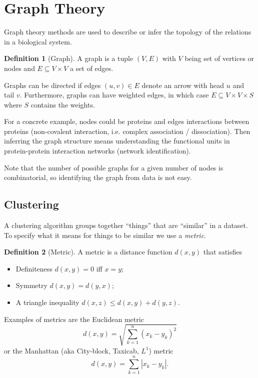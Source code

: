 \documentclass[a4paper]{article}
\theoremstyle{plain}
\theoremstyle{definition}
\newtheorem{defn}{Definition}[section]
\theoremstyle{remark}
\begin{document}
\section{Graph Theory}

Graph theory methods are used to describe or infer the topology of the
relations in a biological system.

\begin{defn}[Graph]
  A graph is a tuple $(V, E)$ with $V$ being set of vertices or nodes and $E
  \subseteq V \times V$ a set of edges.
\end{defn}

Graphs can be directed if edges $(u,v) \in E$ denote an arrow with head $u$ and
tail $v$. Furthermore, graphs can have weighted edges, in which case $E
\subseteq V \times V \times S$ where $S$ contains the weights.

For a concrete example, nodes could be proteins and edges interactions between
proteins (non-covalent interaction, i.e. complex association / dissociation).
Then inferring the graph structure means understanding the functional units in
protein-protein interaction networks (network identification).

Note that the number of possible graphs for a given number of nodes is
combinatorial, so identifying the graph from data is not easy.

\subsection{Clustering}

A clustering algorithm groups together ``things'' that are ``similar'' in a
dataset. To specify what it means for things to be similar we use a
\emph{metric}.

\begin{defn}[Metric]
  A metric is a distance function $d(x,y)$ that satisfies
  \begin{itemize}
    \item Definiteness $d(x, y) = 0$ iff $x = y$;
    \item Symmetry $d(x, y) = d(y, x)$;
    \item A triangle inequality $d(x, z) \leq d(x, y) + d(y, z)$.
  \end{itemize}
\end{defn}
Examples of metrics are the Euclidean metric
\[
  d(x, y) = \sqrt{\sum_{k=1}^n (x_k - y_k)^2}
\]
or the Manhattan (aka City-block, Taxicab, $L^1$) metric
\[
  d(x, y) = \sum_{k=1}^n |x_k - y_k|.
\]
\end{document}
